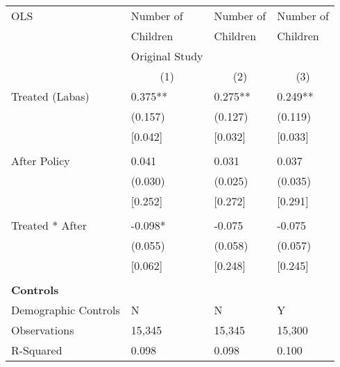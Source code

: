 \begin{tabular}{p{4cm}p{1.5cm}p{1.5cm}p{1.5cm}}
\hline\hline
OLS               &Number of & Number of &Number of \\
&Children & Children & Children\\
&Original Study & &  \\
&\multicolumn{1}{c}{(1)}&\multicolumn{1}{c}{(2)}&\multicolumn{1}{c}{(3)}\\
\hline
Treated (Labas)   &  0.375**&   0.275** & 0.249** \\
                &  (0.157)&  (0.127) & (0.119)\\
									& [0.042]	 &  [0.032]&  [0.033]\\
                \\
After Policy   &   0.041&   0.031 &0.037\\
                &  (0.030)&  (0.025) & (0.035)\\
									& [0.252]	 &  [0.272]&  [0.291]\\								
                \\
Treated * After   & -0.098*&  -0.075 & -0.075\\
                &  (0.055)&  (0.058) &(0.057)\\
									& [0.062]	 &  [0.248]&  [0.245]\\								
                \\

\multicolumn{4}{l}{\textbf{Controls}}  \\                  
Demographic Controls       &   N     &        N&        Y\\

\hline
Observations    &    15,345&    15,345 & 15,300\\
R-Squared    &  0.098   & 0.098 & 0.100     \\
\hline\hline
\end{tabular}